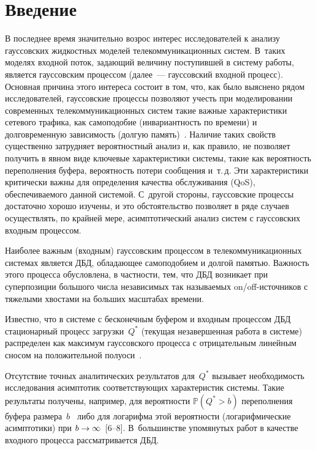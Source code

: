 
      \thispagestyle{headings}

      \begin{multicols}{2}

            \label{st\stat}

\section{Введение}

В последнее время значительно возрос интерес исследователей к
анализу гауссовских жидкостных моделей  телекоммуникационных систем.
В~таких моделях входной поток, задающий величину поступившей в
сис\-те\-му работы, является гауссовским процессом (далее~--- гауссовский
входной процесс). Основная причина этого интереса состоит в том,
что, как было выяснено рядом исследователей, гауссовские процессы
позволяют учесть при моделировании современных телекоммуникационных
систем такие важные характеристики сетевого трафика, как самоподобие
(инвариантность по времени) и долговременную зависимость (долгую
память)~\cite{Leland, Willinger}. Наличие таких свойств существенно
затрудняет вероятностный анализ и, как правило, не позволяет
получить в явном виде ключевые характеристики системы, такие как
вероятность переполнения буфера, вероятность потери сообщения 
и~т.\,д. Эти характеристики   критически важны  для определения
качества обслуживания (QoS), обеспечиваемого данной системой. 
С~другой стороны, гауссовские процессы  достаточно хорошо изучены, и
это обстоятельство позволяет в ряде случаев осуществлять, по крайней
мере, асимптотический анализ систем с гауссовских входным процессом.

Наиболее важным (входным) гауссовским процессом в
телекоммуникационных системах  является ДБД, 
обла\-да\-ющее самоподобием и  долгой памятью. Важность
этого процесса обусловлена, в  частности, тем, что ДБД возникает при
суперпозиции большого числа независимых так называемых
on/off-источников с тяжелыми хвостами на больших масштабах времени.

Известно, что в  системе с  бесконечным буфером и входным процессом
ДБД  стационарный процесс загрузки~$Q^*$ (текущая
незавершенная работа в системе) распределен как  максимум
гауссовского процесса с отрицательным линейным сносом на
положительной полуоси~\cite{Reich}.

Отсутствие точных аналитических результатов для~$Q^*$ вызывает
необходимость исследования асимптотик соответствующих характеристик
системы. Такие результаты получены, например, для ве\-ро\-ят\-ности
$\mathbb{P}\left(Q^*>b \right)$ переполнения буфера размера~$b$~\cite{Narayan, Husler} 
либо для логарифма этой ве\-ро\-ят\-ности
(логарифмические асимптотики) при  $ b \hm\to \infty$~[6--8]. 
В~большинстве  упомянутых  работ в качестве входного процесса рассматривается  ДБД.


\end{multicols}
